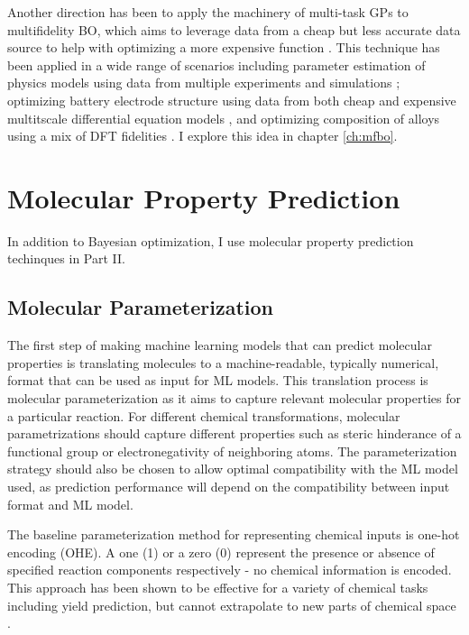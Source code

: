 Another direction has been to apply the machinery of multi-task GPs to multifidelity BO, which aims to leverage data from a cheap but less accurate data source to help with optimizing a more expensive function \cite{Huang2006, Forrester2007}. This technique has been applied in a wide range of scenarios including parameter estimation of physics models using data from multiple experiments and simulations \cite{Perdikaris2016}; optimizing battery electrode structure using data from both cheap and expensive multitscale differential equation models \cite{Pan2017, Folch2023}, and optimizing composition of alloys using a mix of DFT fidelities \cite{Tran2020}. I explore this idea in chapter \ref{ch:mfbo}.

\section{Molecular Property Prediction}

In addition to Bayesian optimization, I use molecular property prediction techinques in Part II.

\subsection{Molecular Parameterization}

The first step of making machine learning models that can predict molecular properties is translating molecules to a machine-readable, typically numerical, format that can be used as input for ML models. This translation process is molecular parameterization as it aims to capture relevant molecular properties for a particular reaction. For different chemical transformations, molecular parametrizations should capture different properties such as steric hinderance of a functional group or electronegativity of neighboring atoms. The parameterization strategy should also be chosen to allow optimal compatibility with the ML model used, as prediction performance will depend on the compatibility between input format and ML model.

The baseline parameterization method for representing chemical inputs is one-hot encoding (OHE). A one (1) or a zero (0) represent the presence or absence of specified reaction components respectively - no chemical information is encoded. This approach has been shown to be effective for a variety of chemical tasks including yield prediction, but cannot extrapolate to new parts of chemical space \cite{Pomberger2023}. 

